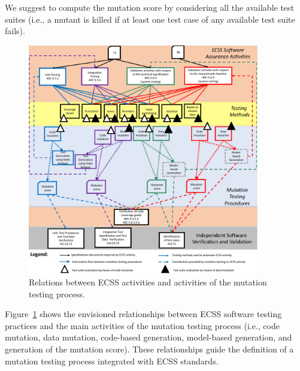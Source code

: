 We suggest to compute the mutation score by considering all the available test suites (i.e., a mutant is killed if at least one test case of any available test suite fails).

\begin{figure}[h]
  \centering
    \includegraphics[width=0.9\textwidth]{images/ECSSTesting}
      \caption{Relations between ECSS activities and activities of the mutation testing process.}
      \label{fig:ECSSTesting}
\end{figure}

Figure~\ref{fig:ECSSTesting} shows the envisioned relationships between ECSS software testing practices and the main activities of the mutation testing process (i.e., code mutation, data mutation, code-based generation, model-based generation, and generation of the mutation score). These relationships guide the definition of a mutation testing process integrated with ECSS standards.


